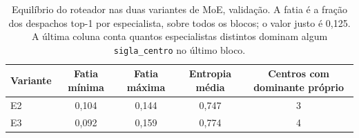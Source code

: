 \begin{table}[ht]
\centering
\caption{Equilíbrio do roteador nas duas variantes de MoE, validação. A fatia é a fração dos despachos top-1 por especialista, sobre todos os blocos; o valor justo é 0,125. A última coluna conta quantos especialistas distintos dominam algum \texttt{sigla\_centro} no último bloco.}
\label{tab:roteamento}
\begin{tabular}{lcccc}
\toprule
Variante & Fatia mínima & Fatia máxima & Entropia média & Centros com dominante próprio \\
\midrule
E2 & 0,104 & 0,144 & 0,747 & 3 \\
E3 & 0,092 & 0,159 & 0,774 & 4 \\
\bottomrule
\end{tabular}
\end{table}
